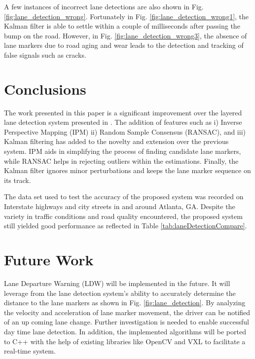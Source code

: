 \documentclass{article}
\begin{document}
A few instances of incorrect lane detections are also shown in Fig. \ref{fig:lane_detection_wrong}. Fortunately in Fig. \ref{fig:lane_detection_wrong1}, the Kalman filter is able to settle within a couple of milliseconds after passing the bump on the road. However, in Fig. \ref{fig:lane_detection_wrong3}, the absence of lane markers due to road aging and wear leads to the detection and tracking of false signals such as cracks.
\section{Conclusions}
\label{sec:concl}
The work presented in this paper is a significant improvement over the layered lane detection system presented in \cite{borkar_layered_2009}. The addition of features such as i) Inverse Perspective Mapping (IPM) ii) Random Sample Consensus (RANSAC), and iii) Kalman filtering has added to the novelty and extension over the previous system. IPM aids in simplifying the process of finding candidate lane markers, while RANSAC helps in rejecting outliers within the estimations. Finally, the Kalman filter ignores minor perturbations and keeps the lane marker sequence on its track.

The data set used to test the accuracy of the proposed system was recorded on Interstate highways and city streets in and around Atlanta, GA. Despite the variety in traffic conditions and road quality encountered, the proposed system still yielded good performance as reflected in Table \ref{tab:laneDetectionCompare}.

\section{Future Work}
\label{sec:print}
Lane Departure Warning (LDW) will be implemented in the future. It will leverage from the lane detection system's ability to accurately determine the distance to the lane markers as shown in Fig. \ref{fig:lane_detection}. By analyzing the velocity and acceleration of lane marker movement, the driver can be notified of an up coming lane change. Further investigation is needed to enable successful day time lane detection. In addition, the implemented algorithms will be ported to C++ with the help of existing libraries like OpenCV and VXL to facilitate a real-time system.

\small


\end{document}
